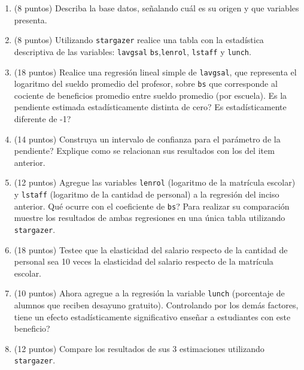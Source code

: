 \documentclass[letterpaper,11pt]{article}
\begin{document}
\begin{enumerate}
\item (8 puntos) Describa la base datos, señalando cuál es su origen y que variables presenta.

\item (8 puntos) Utilizando \texttt{stargazer} realice una tabla con la estadística descriptiva de las variables:  \texttt{lavgsal}
\texttt{bs},\texttt{lenrol}, \texttt{lstaff} y \texttt{lunch}.  

    \item  (18 puntos) Realice una regresión lineal simple de \texttt{lavgsal}, que representa el logaritmo del sueldo promedio del profesor, sobre \texttt{bs} que corresponde al cociente de beneficios promedio entre sueldo promedio (por escuela). 
    Es la pendiente estimada estadísticamente distinta de cero? 
    Es estadísticamente diferente de -1?

    \item (14 puntos) Construya un intervalo de confianza para el parámetro de la pendiente? Explique como se relacionan  sus resultados con los del item anterior.

    \item (12 puntos) Agregue las variables \texttt{lenrol} (logaritmo de la matrícula escolar) y \texttt{lstaff} (logaritmo de la cantidad de personal) 
    a la regresión del inciso anterior. 
    Qué ocurre con el coeficiente de \texttt{bs}? Para realizar su comparaci\'on muestre los resultados de ambas regresiones en una única  tabla utilizando \texttt{stargazer}.
   

    \item (18 puntos) Testee que la elasticidad  del salario respecto de la cantidad de personal sea  10 veces la elasticidad del salario respecto de la  matr\'icula escolar.
    

    \item (10 puntos) Ahora agregue a la regresión la variable \texttt{lunch} (porcentaje de alumnos que reciben desayuno gratuito). Controlando por los demás factores, tiene un efecto estadísticamente significativo  enseñar a estudiantes con este beneficio?
   \item (12 puntos) Compare los resultados de sus 3 estimaciones utilizando \texttt{stargazer}.

\end{enumerate}
\end{document}
